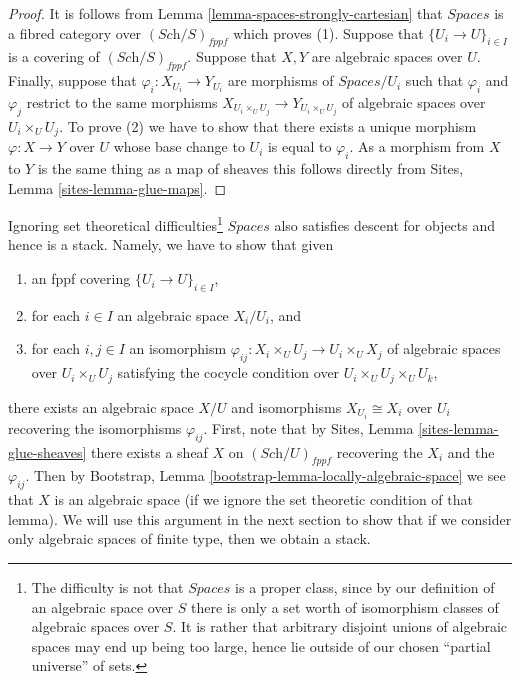 \begin{proof}
It is follows from
Lemma \ref{lemma-spaces-strongly-cartesian}
that $\textit{Spaces}$ is a fibred category over $(\textit{Sch}/S)_{fppf}$
which proves (1).
Suppose that $\{U_i \to U\}_{i \in I}$ is a covering of
$(\textit{Sch}/S)_{fppf}$. Suppose that $X, Y$ are algebraic spaces over
$U$. Finally, suppose that $\varphi_i : X_{U_i} \to Y_{U_i}$ are morphisms
of $\textit{Spaces}/U_i$ such that $\varphi_i$ and $\varphi_j$ restrict
to the same morphisms $X_{U_i \times_U U_j} \to Y_{U_i \times_U U_j}$
of algebraic spaces over $U_i \times_U U_j$. 
To prove (2) we have to show that there exists a unique morphism
$\varphi  : X \to Y$ over $U$ whose base change to $U_i$ is
equal to $\varphi_i$. As a morphism from $X$ to $Y$ is the same thing
as a map of sheaves this follows directly from
Sites, Lemma \ref{sites-lemma-glue-maps}.
\end{proof}

\begin{remark}
\label{remark-stack-spaces}
Ignoring set theoretical difficulties\footnote{The difficulty is not
that $\textit{Spaces}$ is a proper class, since by our definition of
an algebraic space over $S$ there is only a set worth of isomorphism
classes of algebraic spaces over $S$. It is rather that arbitrary disjoint
unions of algebraic spaces may end up being too large, hence lie outside
of our chosen ``partial universe'' of sets.}
$\textit{Spaces}$ also satisfies
descent for objects and hence is a stack. Namely, we have to show that
given
\begin{enumerate}
\item an fppf covering $\{U_i \to U\}_{i \in I}$,
\item for each $i \in I$ an algebraic space $X_i/U_i$, and
\item for each $i, j \in I$ an isomorphism
$\varphi_{ij} : X_i \times_U U_j \to U_i \times_U X_j$ of algebraic spaces
over $U_i \times_U U_j$ satisfying the cocycle condition over
$U_i \times_U U_j \times_U U_k$,
\end{enumerate}
there exists an algebraic space $X/U$ and isomorphisms
$X_{U_i} \cong X_i$ over $U_i$ recovering the isomorphisms $\varphi_{ij}$.
First, note that by
Sites, Lemma \ref{sites-lemma-glue-sheaves}
there exists a sheaf $X$ on $(\textit{Sch}/U)_{fppf}$ recovering
the $X_i$ and the $\varphi_{ij}$. Then by
Bootstrap, Lemma \ref{bootstrap-lemma-locally-algebraic-space}
we see that $X$ is an algebraic space (if we ignore the set theoretic
condition of that lemma).
We will use this argument in the next section to show that
if we consider only algebraic spaces of finite type, then we obtain
a stack.
\end{remark}






